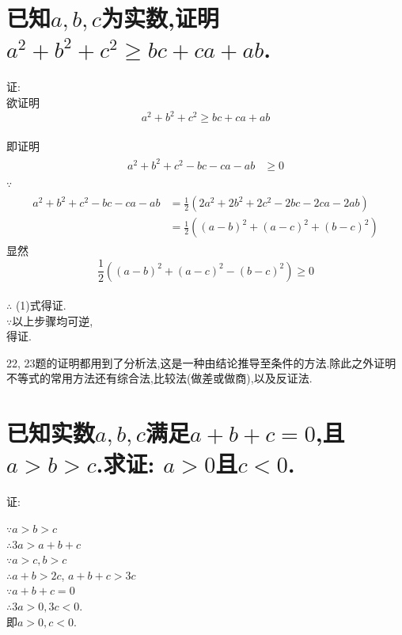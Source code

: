\documentclass{article}
\newcommand{\1}{\underline{\makebox[1cm]{}}}
\newcommand{\2}{\underline{\makebox[2cm]{}}}
\newcommand{\3}{\underline{\makebox[3cm]{}}}
\newcommand{\4}{\underline{\makebox[4cm]{}}}
\newcommand{\blkx}{\vspace*{4\baselineskip} }
\newlength{\la}
\begin{document}
\section{已知$a,b,c$为实数,证明$a^2+b^2+c^2 \geq bc+ca+ab$.}
        {\large
        证:
        \\
        欲证明$$a^2+b^2+c^2 \geq bc+ca+ab$$\\
        即证明
        \begin{align}
            \begin{aligned}
               a^2+b^2+c^2 - bc-ca-ab &\geq 0 
            \end{aligned}
        \end{align}
        $\because$
        \begin{align}
            \begin{aligned}
                a^2+b^2+c^2 - bc-ca-ab &= \frac{1}{2}(2a^2+2b^2+2c^2 - 2bc-2ca-2ab)
                \nonumber\\
                &= \frac{1}{2}((a-b)^2+(a-c)^2+(b-c)^2)
            \end{aligned}
        \end{align}
        显然$$\frac{1}{2}((a-b)^2+(a-c)^2-(b-c)^2) \geq 0$$\\
        $\therefore$ (1)式得证.\\
        $\because$以上步骤均可逆,\\
        得证.\\
        
        \rightline{$\blacksquare$}
        
}
\blkx
\Large 22, 23题的证明都用到了分析法,这是一种由结论推导至条件的方法.除此之外证明不等式的常用方法还有综合法,比较法(做差或做商),以及反证法.



\newpage
\section{已知实数$a,b,c$满足$a+b+c=0$,且$a>b>c$.求证: $a>0$且$c<0$.}
    {\large
    证:
    \begin{center}
        $\because a>b>c$\\
        $\therefore 3a>a+b+c$\\
        $\because a>c,b>c$\\
        $\therefore a+b>2c$,
        $a+b+c>3c$\\
        $\because a+b+c=0$\\
        $\therefore 3a>0, 3c<0$.\\
        即$a>0, c<0$.
    \end{center}
    }
    
\end{document}
